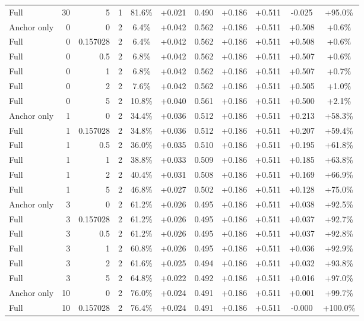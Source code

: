 \begin{table}[htbp]
\begin{tabular}{lrrrccccccc}
Full & 30 & 5 & 1 & 81.6\% & +0.021 & 0.490 & +0.186 & +0.511 & -0.025 & +95.0\% \\
Anchor only & 0 & 0 & 2 & 6.4\% & +0.042 & 0.562 & +0.186 & +0.511 & +0.508 & +0.6\% \\
Full & 0 & 0.157028 & 2 & 6.4\% & +0.042 & 0.562 & +0.186 & +0.511 & +0.508 & +0.6\% \\
Full & 0 & 0.5 & 2 & 6.8\% & +0.042 & 0.562 & +0.186 & +0.511 & +0.507 & +0.6\% \\
Full & 0 & 1 & 2 & 6.8\% & +0.042 & 0.562 & +0.186 & +0.511 & +0.507 & +0.7\% \\
Full & 0 & 2 & 2 & 7.6\% & +0.042 & 0.562 & +0.186 & +0.511 & +0.505 & +1.0\% \\
Full & 0 & 5 & 2 & 10.8\% & +0.040 & 0.561 & +0.186 & +0.511 & +0.500 & +2.1\% \\
Anchor only & 1 & 0 & 2 & 34.4\% & +0.036 & 0.512 & +0.186 & +0.511 & +0.213 & +58.3\% \\
Full & 1 & 0.157028 & 2 & 34.8\% & +0.036 & 0.512 & +0.186 & +0.511 & +0.207 & +59.4\% \\
Full & 1 & 0.5 & 2 & 36.0\% & +0.035 & 0.510 & +0.186 & +0.511 & +0.195 & +61.8\% \\
Full & 1 & 1 & 2 & 38.8\% & +0.033 & 0.509 & +0.186 & +0.511 & +0.185 & +63.8\% \\
Full & 1 & 2 & 2 & 40.4\% & +0.031 & 0.508 & +0.186 & +0.511 & +0.169 & +66.9\% \\
Full & 1 & 5 & 2 & 46.8\% & +0.027 & 0.502 & +0.186 & +0.511 & +0.128 & +75.0\% \\
Anchor only & 3 & 0 & 2 & 61.2\% & +0.026 & 0.495 & +0.186 & +0.511 & +0.038 & +92.5\% \\
Full & 3 & 0.157028 & 2 & 61.2\% & +0.026 & 0.495 & +0.186 & +0.511 & +0.037 & +92.7\% \\
Full & 3 & 0.5 & 2 & 61.2\% & +0.026 & 0.495 & +0.186 & +0.511 & +0.037 & +92.8\% \\
Full & 3 & 1 & 2 & 60.8\% & +0.026 & 0.495 & +0.186 & +0.511 & +0.036 & +92.9\% \\
Full & 3 & 2 & 2 & 61.6\% & +0.025 & 0.494 & +0.186 & +0.511 & +0.032 & +93.8\% \\
Full & 3 & 5 & 2 & 64.8\% & +0.022 & 0.492 & +0.186 & +0.511 & +0.016 & +97.0\% \\
Anchor only & 10 & 0 & 2 & 76.0\% & +0.024 & 0.491 & +0.186 & +0.511 & +0.001 & +99.7\% \\
Full & 10 & 0.157028 & 2 & 76.4\% & +0.024 & 0.491 & +0.186 & +0.511 & -0.000 & +100.0\% \\

\end{tabular}
\end{table}
